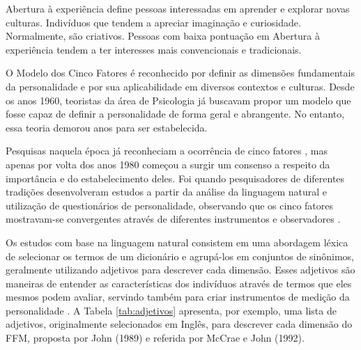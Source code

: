 Abertura à experiência define pessoas interessadas em aprender e explorar novas culturas. Indivíduos que tendem a apreciar imaginação e curiosidade. Normalmente, são criativos. Pessoas com baixa pontuação em Abertura à experiência tendem a ter interesses mais convencionais e tradicionais.

O Modelo dos Cinco Fatores é reconhecido por definir as dimensões fundamentais da personalidade e por sua aplicabilidade em diversos contextos e culturas. Desde os anos 1960, teoristas da área de Psicologia já buscavam propor um modelo que fosse capaz de definir a personalidade de forma geral e abrangente. No entanto, essa teoria demorou anos para ser estabelecida.

Pesquisas naquela época já reconheciam a ocorrência de cinco fatores \cite{tupes:61, norman:63}, mas apenas por volta dos anos 1980 começou a surgir um consenso a respeito da importância e do estabelecimento deles. Foi quando pesquisadores de diferentes tradições desenvolveram estudos a partir da análise da linguagem natural e utilização de questionários de personalidade, observando que os cinco fatores mostravam-se convergentes através de diferentes instrumentos e observadores \cite{mccrae:92}.

Os estudos com base na linguagem natural consistem em uma abordagem léxica de selecionar os termos de um dicionário %
e agrupá-los em conjuntos de sinônimos, geralmente utilizando adjetivos para descrever cada dimensão. Esses adjetivos são maneiras de entender as características dos indivíduos através de termos que eles mesmos podem avaliar, servindo também para criar instrumentos de medição da personalidade \cite{goldberg:83, mccrae:85}. A Tabela \ref{tab:adjetivos} apresenta, por exemplo, uma lista de adjetivos, originalmente selecionados em Inglês, para descrever cada dimensão do FFM, proposta por John (1989)\nocite{john:89} e referida por McCrae e John (1992)\nocite{mccrae:92}.

